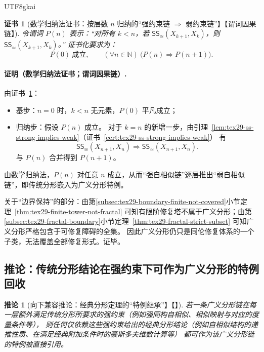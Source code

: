 \documentclass[12pt]{article}
\newtheorem{corollary}{推论}[section]
\newtheorem{Certificate}{证书}[section]
\newcommand{\NN}{\mathbb{N}}
\newcommand{\KouJing}{\texorpdfstring{表述约定}{表述约定}}
\begin{document}
\begin{CJK*}{UTF8}{gkai}
\begin{Certificate}[数学归纳法证书：按层数 $n$ 归纳的“强约束链 $\Rightarrow$ 弱约束链”】【谓词因果链】]
\label{cert:tex29-paradigm-extension}
令谓词 $P(n)$ 表示：“对所有 $k<n$，若 $\mathsf{SS}_{\cong}(X_{k+1},X_k)$，则 $\mathsf{SS}_{\simeq}(X_{k+1},X_k)$。”
证书化要求为：
\[
  P(0)\ \text{成立},\qquad (\forall n\in\NN)\ \bigl(P(n)\Rightarrow P(n+1)\bigr).
\]
\end{Certificate}

\paragraph{证明（数学归纳法证书；谓词因果链）.}
由证书~\ref{cert:tex29-paradigm-extension}：
\begin{itemize}
  \item 基步：$n=0$ 时，$k<n$ 无元素，$P(0)$ 平凡成立；
  \item 归纳步：假设 $P(n)$ 成立。
  对于 $k=n$ 的新增一步，由引理~\ref{lem:tex29-ss-strong-implies-weak}（证书~\ref{cert:tex29-ss-strong-implies-weak}）
  有
  \[
    \mathsf{SS}_{\cong}(X_{n+1},X_n)\Rightarrow \mathsf{SS}_{\simeq}(X_{n+1},X_n).
  \]
  与 $P(n)$ 合并得到 $P(n+1)$。
\end{itemize}
由数学归纳法，$P(n)$ 对任意 $n$ 成立，从而“强自相似链”逐层推出“弱自相似链”，即传统分形嵌入为广义分形特例。

关于“边界保持”的部分：由第\ref{subsec:tex29-boundary-finite-not-covered}小节定理~\ref{thm:tex29-finite-tower-not-fractal}
可知有限阶修复塔不属于广义分形；由第\ref{subsec:tex29-fractal-boundary}小节定理~\ref{thm:tex29-fractal-strict-subset}
可知广义分形严格包含于可修复障碍的全集。
因此广义分形仍只是同伦修复体系的一个子类，无法覆盖全部修复形式。证毕。

\subsection{推论：传统分形结论在强约束下可作为广义分形的特例回收}
\label{subsec:tex29-classical-results-recovered}

\begin{corollary}[向下兼容推论：经典分形定理的“特例继承”】【】]
\label{cor:tex29-classical-results-recovered}
若一条广义分形链在每一层额外满足传统分形所要求的强约束（例如强同构自相似、相似映射与对应的度量条件等），
则任何仅依赖这些强约束给出的经典分形结论（例如自相似结构的递推性质、在满足经典附加条件时的豪斯多夫维数计算等）
都可作为该广义分形链的特例被直接引用。
\end{corollary}


\end{CJK*}
\end{document}
